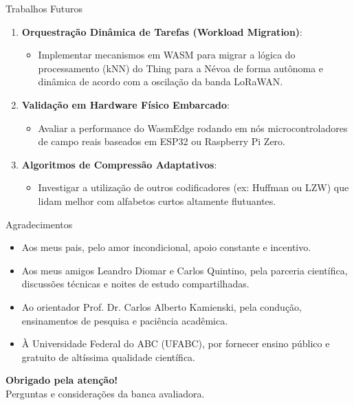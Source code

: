 \documentclass[aspectratio=169]{beamer}
\begin{document}
\begin{frame}{Trabalhos Futuros}
  \begin{enumerate}
    \item \textbf{Orquestração Dinâmica de Tarefas (Workload Migration)}:
      \begin{itemize}
        \item Implementar mecanismos em WASM para migrar a lógica do processamento (kNN) do Thing para a Névoa de forma autônoma e dinâmica de acordo com a oscilação da banda LoRaWAN.
      \end{itemize}
    \vspace{0.2cm}
    \item \textbf{Validação em Hardware Físico Embarcado}:
      \begin{itemize}
        \item Avaliar a performance do WasmEdge rodando em nós microcontroladores de campo reais baseados em ESP32 ou Raspberry Pi Zero.
      \end{itemize}
    \vspace{0.2cm}
    \item \textbf{Algoritmos de Compressão Adaptativos}:
      \begin{itemize}
        \item Investigar a utilização de outros codificadores (ex: Huffman ou LZW) que lidam melhor com alfabetos curtos altamente flutuantes.
      \end{itemize}
  \end{enumerate}
\end{frame}

\begin{frame}{Agradecimentos}
  \begin{itemize}
    \item Aos meus pais, pelo amor incondicional, apoio constante e incentivo.
    \item Aos meus amigos Leandro Diomar e Carlos Quintino, pela parceria científica, discussões técnicas e noites de estudo compartilhadas.
    \item Ao orientador Prof. Dr. Carlos Alberto Kamienski, pela condução, ensinamentos de pesquisa e paciência acadêmica.
    \item À Universidade Federal do ABC (UFABC), por fornecer ensino público e gratuito de altíssima qualidade científica.
  \end{itemize}
  \vspace{0.5cm}
  \centering
  \textbf{\large Obrigado pela atenção!}\\
  \vspace{0.2cm}
  Perguntas e considerações da banca avaliadora.
\end{frame}
\end{document}
